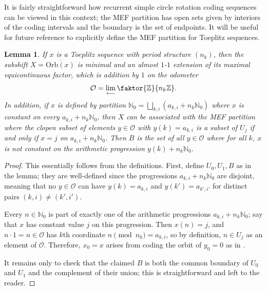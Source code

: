\documentclass[11pt,reqno]{amsart}
\newtheorem{lemma}[theorem]{Lemma}
\theoremstyle{definition}
\theoremstyle{plain}
\newcommand{\OO}{\mathrm{Orb}}
\newcommand{\Z}{\mathbb{Z}}
\newcommand{\N}{\mathbb{N}}
\newcommand{\AuthornoteA}[2]{{\sf\small\color{magenta}{[#1: #2]}}}
\newcommand{\Anote}{\AuthornoteA{A}}
\begin{document}
It is fairly straightforward how recurrent simple circle rotation coding sequences can be viewed in this context; the MEF partition has open sets given by interiors of the coding intervals and the boundary is the set of endpoints. It will be useful for future reference to explicitly define the MEF partition for Toeplitz sequences.

\begin{lemma}\label{toeMEF}
    If $x$ is a Toeplitz sequence with period structure $(n_k)$, then the subshift $X = \overline{\OO(x)}$ is minimal and an almost $1$-$1$ extension of its maximal equicontinuous factor, which is addition by $1$ on the odometer
    \[
    \mathcal{O} = \lim_{\longleftarrow} \faktor{\Z}{n_k \Z}.
    \]
In addition, if $x$ is defined by partition $\N_0 = \bigsqcup_{k,i} (a_{k,i} + n_k \N_0)$ where $x$ is constant on every $a_{k,i} + n_k \N_0$, then $X$ can be associated with the MEF partition where the clopen subset of elements $y \in \mathcal{O}$ with $y(k) = a_{k,i}$ is a subset of $U_j$ if and only if $x = j$ on $a_{k,i} + n_k \N_0$. Then $B$ is the set of all $y \in \mathcal{O}$ where for all $k$, $x$ is not constant on the arithmetic progression $y(k) + n_k \N_0$.
\end{lemma}


\begin{proof}
This essentially follows from the definitions. First, define $U_0, U_1, B$ as in the lemma; they are well-defined since the progressions $a_{k,i} + n_k\N_0$ are disjoint, meaning that no $y \in \mathcal{O}$ can have $y(k) = a_{k,i}$ and $y(k') = a_{k',i'}$ for distinct pairs $(k,i) \neq (k', i')$. 

Every $n \in \N_0$ is part of exactly one of the arithmetic progressions $a_{k,i} + n_k \N_0$; say that $x$ has constant value $j$ on this progression. Then $x(n) = j$, and $n \cdot 1 = n \in \mathcal{O}$ has $k$th coordinate $n \pmod{n_k} = a_{k,i}$, so by definition, $n \in U_j$ as an element of $\mathcal{O}$. Therefore, $x_0 = x$ arises from coding the orbit of $y_0 = 0$ as in . 

It remains only to check that the claimed $B$ is both the common boundary of $U_0$ and $U_1$ and the complement of their union; this is straightforward and left to the reader.

\end{proof}
\end{document}
